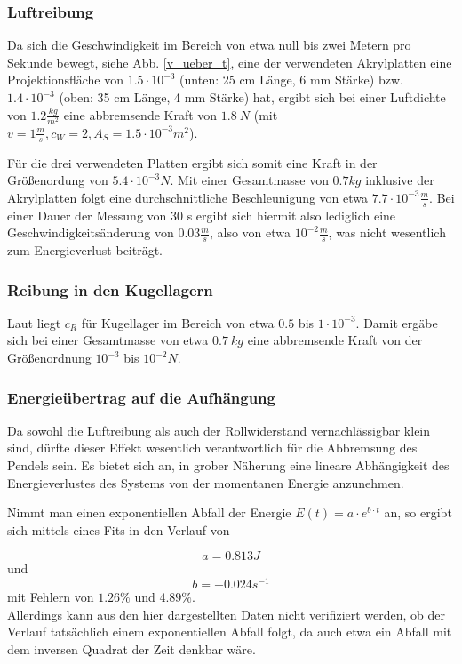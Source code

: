 \subsubsection{Luftreibung}
Da sich die Geschwindigkeit im Bereich von etwa null bis zwei Metern pro Sekunde bewegt, siehe Abb. \ref{v_ueber_t}, eine der verwendeten Akrylplatten eine Projektionsfläche von $ 1.5 \cdot 10^{-3} $ (unten: 25 cm Länge, 6 mm Stärke) bzw. $ 1.4 \cdot 10^{-3} $ (oben: 35 cm Länge, 4 mm Stärke) hat, ergibt sich bei einer Luftdichte von $ 1.2 \frac{kg}{m^2} $ eine abbremsende Kraft von $ 1.8 \ N $ (mit $ v = 1 \frac{m}{s}, c_W = 2, A_S = 1.5 \cdot 10^{-3} m^2 $). 

Für die drei verwendeten Platten ergibt sich somit eine Kraft in der Größenordung von $ 5.4 \cdot 10^{-3}  N $. Mit einer Gesamtmasse von $0.7 kg$ inklusive der Akrylplatten folgt eine durchschnittliche Beschleunigung von etwa $ 7.7 \cdot 10^{-3} \frac{m}{s} $. Bei einer Dauer der Messung von 30 s ergibt sich hiermit also lediglich eine Geschwindigkeitsänderung von $ 0.03 \frac{m}{s} $, also von etwa $ 10^{-2} \frac{m}{s} $, was nicht wesentlich zum Energieverlust beiträgt. 


\subsubsection{Reibung in den Kugellagern}
Laut \cite{wiki} liegt $ c_R $ für Kugellager im Bereich von etwa 
$ 0.5 $ bis $ 1 \cdot 10^{-3} $. 
Damit ergäbe sich bei einer Gesamtmasse von etwa $ 0.7 \  kg  $ eine abbremsende Kraft von der Größenordnung $ 10^{-3} $ bis $ 10^{-2} N $. 

\subsubsection{Energieübertrag auf die Aufhängung}
Da sowohl die Luftreibung als auch der Rollwiderstand vernachlässigbar klein sind, dürfte dieser Effekt wesentlich verantwortlich für die Abbremsung des Pendels sein. 
Es bietet sich an, in grober Näherung eine lineare Abhängigkeit des Energieverlustes des Systems von der momentanen Energie anzunehmen. 

Nimmt man einen exponentiellen Abfall der Energie $ E(t) = a \cdot e^{b \cdot t} $ an, so ergibt sich mittels eines Fits in den Verlauf von 

\begin{equation}
 a = 0.813   J
\nonumber
\end{equation}  und  
\begin{equation}
b = -0.024  s^{-1}
\nonumber
\end{equation} 
mit Fehlern von $1.26 \% $ und $ 4.89 \% $. \\
Allerdings kann aus den hier dargestellten Daten nicht verifiziert werden, ob der Verlauf tatsächlich einem exponentiellen Abfall folgt, da auch etwa ein Abfall mit dem inversen Quadrat der Zeit denkbar wäre. 

